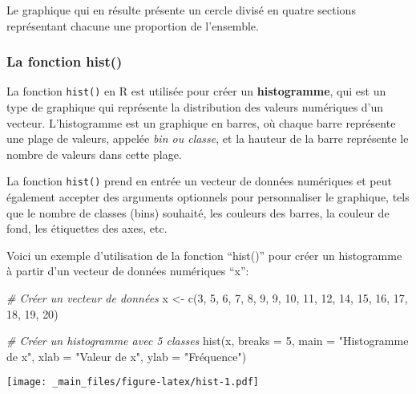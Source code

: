 \documentclass[
]{article}
\newenvironment{Shaded}{\begin{snugshade}}{\end{snugshade}}
\newcommand{\AttributeTok}[1]{\textcolor[rgb]{0.77,0.63,0.00}{#1}}
\newcommand{\CommentTok}[1]{\textcolor[rgb]{0.56,0.35,0.01}{\textit{#1}}}
\newcommand{\DecValTok}[1]{\textcolor[rgb]{0.00,0.00,0.81}{#1}}
\newcommand{\FunctionTok}[1]{\textcolor[rgb]{0.00,0.00,0.00}{#1}}
\newcommand{\NormalTok}[1]{#1}
\newcommand{\OtherTok}[1]{\textcolor[rgb]{0.56,0.35,0.01}{#1}}
\newcommand{\StringTok}[1]{\textcolor[rgb]{0.31,0.60,0.02}{#1}}
\begin{document}
Le graphique qui en résulte présente un cercle divisé en quatre sections représentant chacune une proportion de l'ensemble.

\hypertarget{la-fonction-hist}{%
\subsubsection{La fonction hist()}\label{la-fonction-hist}}

La fonction \texttt{hist()} en R est utilisée pour créer un \textbf{histogramme}, qui est un type de graphique qui représente la distribution des valeurs numériques d'un vecteur. L'histogramme est un graphique en barres, où chaque barre représente une plage de valeurs, appelée \emph{bin ou classe}, et la hauteur de la barre représente le nombre de valeurs dans cette plage.

La fonction \texttt{hist()} prend en entrée un vecteur de données numériques et peut également accepter des arguments optionnels pour personnaliser le graphique, tels que le nombre de classes (bins) souhaité, les couleurs des barres, la couleur de fond, les étiquettes des axes, etc.

Voici un exemple d'utilisation de la fonction ``hist()'' pour créer un histogramme à partir d'un vecteur de données numériques ``x'':

\begin{Shaded}
\begin{Highlighting}[]
\CommentTok{\# Créer un vecteur de données}
\NormalTok{x }\OtherTok{\textless{}{-}} \FunctionTok{c}\NormalTok{(}\DecValTok{3}\NormalTok{, }\DecValTok{5}\NormalTok{, }\DecValTok{6}\NormalTok{, }\DecValTok{7}\NormalTok{, }\DecValTok{8}\NormalTok{, }\DecValTok{9}\NormalTok{, }\DecValTok{9}\NormalTok{, }\DecValTok{10}\NormalTok{, }\DecValTok{11}\NormalTok{, }\DecValTok{12}\NormalTok{, }\DecValTok{14}\NormalTok{, }\DecValTok{15}\NormalTok{, }\DecValTok{16}\NormalTok{, }\DecValTok{17}\NormalTok{, }\DecValTok{18}\NormalTok{, }\DecValTok{19}\NormalTok{, }\DecValTok{20}\NormalTok{)}

\CommentTok{\# Créer un histogramme avec 5 classes}
\FunctionTok{hist}\NormalTok{(x, }\AttributeTok{breaks =} \DecValTok{5}\NormalTok{, }\AttributeTok{main =} \StringTok{"Histogramme de x"}\NormalTok{, }\AttributeTok{xlab =} \StringTok{"Valeur de x"}\NormalTok{, }\AttributeTok{ylab =} \StringTok{"Fréquence"}\NormalTok{)}
\end{Highlighting}
\end{Shaded}

\texttt{[image: \_main\_files/figure-latex/hist-1.pdf]}
\end{document}
